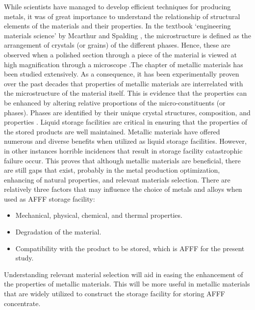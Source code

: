 \documentclass[12pt]{report}
\begin{document}
While scientists have managed to develop efficient techniques for producing metals, it was of great importance to understand the relationship of structural elements of the materials and their properties. In the textbook ‘engineering materials science’ by Mcarthur and Spalding \cite{mcarthur2004engineering}, the microstructure is defined as the arrangement of crystals (or grains) of the different phases. Hence, these are observed when a polished section through a piece of the material is viewed at high magnification through a microscope \cite{molabe2018determining}.The chapter of metallic materials has been studied extensively. As a consequence, it has been experimentally proven over the past decades that properties of metallic materials are interrelated with the microstructure of the material itself. This is evidence that the properties can be enhanced by altering relative proportions of the micro-constituents (or phases). Phases are identified by their unique crystal structures, composition, and properties \cite{mcarthur2004engineering}.
Liquid storage facilities are critical in ensuring that the properties of the stored products are well maintained. Metallic materials have offered numerous and diverse benefits when utilized as liquid storage facilities. However, in other instances horrible incidences that result in storage facility catastrophic failure occur. This proves that although metallic materials are beneficial, there are still gaps that exist, probably in the metal production optimization, enhancing of natural properties, and relevant materials selection. There are relatively three factors that may influence the choice of metals and alloys when used as AFFF storage facility:

\begin{itemize}
    \item Mechanical, physical, chemical, and thermal properties.
    \item Degradation of the material.
    \item Compatibility with the product to be stored, which is AFFF for the present study.
\end{itemize}

Understanding relevant material selection will aid in easing the enhancement of the properties of metallic materials. This will be more useful in metallic materials that are widely utilized to construct the storage facility for storing AFFF concentrate. 
\end{document}
